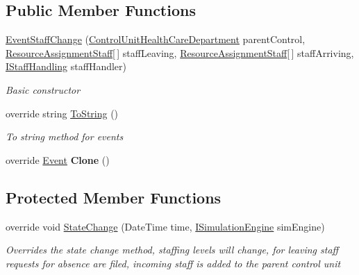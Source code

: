 \subsection*{Public Member Functions}
\begin{DoxyCompactItemize}
\item 
\hyperlink{class_general_health_care_elements_1_1_staff_handling_1_1_event_staff_change_a673b9850d4694faa2977bfccb29cf14e}{Event\+Staff\+Change} (\hyperlink{class_general_health_care_elements_1_1_control_units_1_1_control_unit_health_care_department}{Control\+Unit\+Health\+Care\+Department} parent\+Control, \hyperlink{class_general_health_care_elements_1_1_resource_handling_1_1_resource_assignment_staff}{Resource\+Assignment\+Staff}\mbox{[}$\,$\mbox{]} staff\+Leaving, \hyperlink{class_general_health_care_elements_1_1_resource_handling_1_1_resource_assignment_staff}{Resource\+Assignment\+Staff}\mbox{[}$\,$\mbox{]} staff\+Arriving, \hyperlink{interface_general_health_care_elements_1_1_staff_handling_1_1_i_staff_handling}{I\+Staff\+Handling} staff\+Handler)
\begin{DoxyCompactList}\small\item\em Basic constructor \end{DoxyCompactList}\item 
override string \hyperlink{class_general_health_care_elements_1_1_staff_handling_1_1_event_staff_change_a90449700d2d66c81b6d3db91010dae9a}{To\+String} ()
\begin{DoxyCompactList}\small\item\em To string method for events \end{DoxyCompactList}\item 
override \hyperlink{class_simulation_core_1_1_h_c_c_m_elements_1_1_event}{Event} {\bfseries Clone} ()\hypertarget{class_general_health_care_elements_1_1_staff_handling_1_1_event_staff_change_addc73791037abd8bb6ee1ce551c75f71}{}\label{class_general_health_care_elements_1_1_staff_handling_1_1_event_staff_change_addc73791037abd8bb6ee1ce551c75f71}

\end{DoxyCompactItemize}
\subsection*{Protected Member Functions}
\begin{DoxyCompactItemize}
\item 
override void \hyperlink{class_general_health_care_elements_1_1_staff_handling_1_1_event_staff_change_a130cee538c64cdd33a950881159fab25}{State\+Change} (Date\+Time time, \hyperlink{interface_simulation_core_1_1_simulation_classes_1_1_i_simulation_engine}{I\+Simulation\+Engine} sim\+Engine)
\begin{DoxyCompactList}\small\item\em Overrides the state change method, staffing levels will change, for leaving staff requests for absence are filed, incoming staff is added to the parent control unit \end{DoxyCompactList}\end{DoxyCompactItemize}
